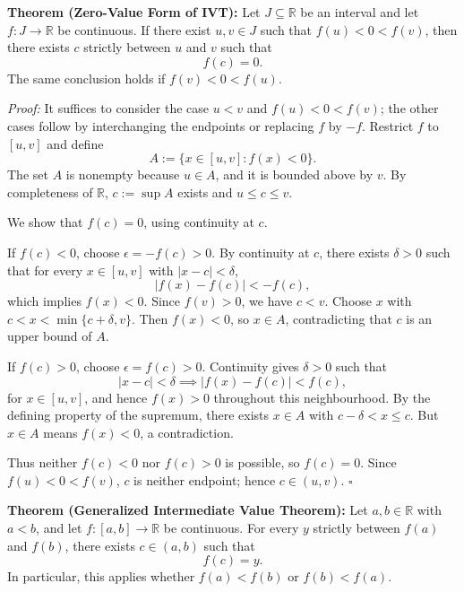 \documentclass[a4paper,11pt,abstracton]{scrartcl}
\newcommand{\RR}{\mathbb{R}}
\theoremstyle{dotlessP}
\theoremstyle{dotlessS}
\theoremstyle{remark}
\theoremstyle{definition}
\begin{document}
\begin{problem_box}
\textbf{Theorem (Zero-Value Form of IVT):}
Let $J\subseteq\RR$ be an interval and let $f:J\to\RR$ be continuous. If there exist $u,v\in J$ such that $f(u)<0<f(v)$, then there exists $c$ strictly between $u$ and $v$ such that
\[
    f(c)=0.
\]
The same conclusion holds if $f(v)<0<f(u)$.
\end{problem_box}

\begin{claim_box}
\textit{Proof:}
It suffices to consider the case $u<v$ and $f(u)<0<f(v)$; the other cases follow by interchanging the endpoints or replacing $f$ by $-f$. Restrict $f$ to $[u,v]$ and define
\[
    A:=\{x\in[u,v]:f(x)<0\}.
\]
The set $A$ is nonempty because $u\in A$, and it is bounded above by $v$. By completeness of $\RR$, $c:=\sup A$ exists and $u\le c\le v$.

We show that $f(c)=0$, using continuity at $c$.

If $f(c)<0$, choose $\epsilon=-f(c)>0$. By continuity at $c$, there exists $\delta>0$ such that for every $x\in[u,v]$ with $|x-c|<\delta$,
\[
    |f(x)-f(c)|<-f(c),
\]
which implies $f(x)<0$. Since $f(v)>0$, we have $c<v$. Choose $x$ with $c<x<\min\{c+\delta,v\}$. Then $f(x)<0$, so $x\in A$, contradicting that $c$ is an upper bound of $A$.

If $f(c)>0$, choose $\epsilon=f(c)>0$. Continuity gives $\delta>0$ such that
\[
    |x-c|<\delta\implies |f(x)-f(c)|<f(c),
\]
for $x\in[u,v]$, and hence $f(x)>0$ throughout this neighbourhood. By the defining property of the supremum, there exists $x\in A$ with $c-\delta<x\le c$. But $x\in A$ means $f(x)<0$, a contradiction.

Thus neither $f(c)<0$ nor $f(c)>0$ is possible, so $f(c)=0$. Since $f(u)<0<f(v)$, $c$ is neither endpoint; hence $c\in(u,v)$.
\hfill$\square$
\end{claim_box}

\begin{problem_box}
\textbf{Theorem (Generalized Intermediate Value Theorem):}
Let $a,b\in\RR$ with $a<b$, and let $f:[a,b]\to\RR$ be continuous. For every $y$ strictly between $f(a)$ and $f(b)$, there exists $c\in(a,b)$ such that
\[
    f(c)=y.
\]
In particular, this applies whether $f(a)<f(b)$ or $f(b)<f(a)$.
\end{problem_box}
\end{document}
